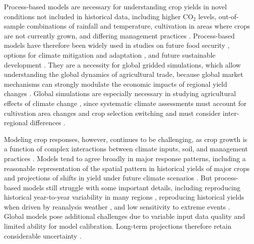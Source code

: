 \documentclass[gmd, manuscript]{copernicus} %
\begin{document}
Process-based models are necessary for understanding crop yields in novel conditions not included in historical data, including higher CO$_2$ levels, out-of-sample combinations of rainfall and temperature, cultivation in areas where crops are not currently grown, and differing management practices \citep[e.g.][]{pugh_climate_2016, Roberts2017,minoli2019modelling}. Process-based models have therefore been widely used in studies on future food security \citep{wheeler2013climate, Elliott14, frieler2017assessing}, options for climate mitigation \citep{muller2015} and adaptation \citep{challinor2018improving}, and future sustainable development \citep{humpenoder2018large, jagermeyr_reconciling_2017}.
They are a necessity for global gridded simulations, which allow understanding the global dynamics of agricultural trade, because global market mechanisms can strongly modulate the economic impacts of regional yield changes \citep{Stevanovic2016,hasegawa2018risk}. 
Global simulations are especially necessary in studying agricultural effects of climate change  \citep{muller_global_2017}, since systematic climate assessments must account for cultivation area changes and crop selection switching \citep{rosenzweig2018,ruane2018} and must consider inter-regional differences \citep[e.g.][]{Nelson2014, Wiebe_2015}.

Modeling crop responses, however, continues to be challenging, as crop growth is a function of complex interactions between climate inputs, soil, and management practices \citep{Boote13,rotter2011}. 
Models tend to agree broadly in major response patterns, including a reasonable representation of the spatial pattern in historical yields of major crops and projections of shifts in yield under future climate scenarios \citep[e.g.][]{Elliott2015, muller_global_2017}. 
But process-based models still struggle with some important details, including reproducing historical year-to-year variability in many regions \citep[e.g.][]{muller_global_2017, Jag2018}, reproducing historical yields when driven by reanalysis weather \citep[e.g.][]{Glotter14}, and low sensitivity to extreme events \citep[e.g.][]{Glotter15,schewe2019}. 
Global models pose additional challenges due to variable input data quality and limited ability for model calibration.
Long-term projections therefore retain considerable uncertainty \citep{WOLF2002217, JAGTAP200273, Iizumi2010, ANGULO201332, Asseng2013, Asseng2015}. 
\end{document}
